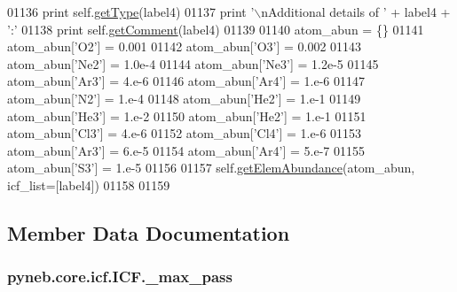 \begin{DoxyCode}
01136         \textcolor{keywordflow}{print} self.\hyperlink{classpyneb_1_1core_1_1icf_1_1_i_c_f_aac6e143db503b68856b979c07f770b81}{getType}(label4)
01137         \textcolor{keywordflow}{print} \textcolor{stringliteral}{'\(\backslash\)nAdditional details of '} + label4 + \textcolor{stringliteral}{':'}
01138         \textcolor{keywordflow}{print} self.\hyperlink{classpyneb_1_1core_1_1icf_1_1_i_c_f_a0a07d882935f470f4c51af82ed785217}{getComment}(label4) 
01139 
01140         atom\_abun = \{\}
01141         atom\_abun[\textcolor{stringliteral}{'O2'}] = 0.001
01142         atom\_abun[\textcolor{stringliteral}{'O3'}] = 0.002
01143         atom\_abun[\textcolor{stringliteral}{'Ne2'}] = 1.0e-4
01144         atom\_abun[\textcolor{stringliteral}{'Ne3'}] = 1.2e-5
01145         atom\_abun[\textcolor{stringliteral}{'Ar3'}] = 4.e-6
01146         atom\_abun[\textcolor{stringliteral}{'Ar4'}] = 1.e-6
01147         atom\_abun[\textcolor{stringliteral}{'N2'}] = 1.e-4
01148         atom\_abun[\textcolor{stringliteral}{'He2'}] = 1.e-1
01149         atom\_abun[\textcolor{stringliteral}{'He3'}] = 1.e-2
01150         atom\_abun[\textcolor{stringliteral}{'He2'}] = 1.e-1
01151         atom\_abun[\textcolor{stringliteral}{'Cl3'}] = 4.e-6
01152         atom\_abun[\textcolor{stringliteral}{'Cl4'}] = 1.e-6
01153         atom\_abun[\textcolor{stringliteral}{'Ar3'}] = 6.e-5
01154         atom\_abun[\textcolor{stringliteral}{'Ar4'}] = 5.e-7
01155         atom\_abun[\textcolor{stringliteral}{'S3'}] = 1.e-5
01156 
01157         self.\hyperlink{classpyneb_1_1core_1_1icf_1_1_i_c_f_a30b52d6d1ec148fba7c0a15cad653f61}{getElemAbundance}(atom\_abun, icf\_list=[label4])
01158 
01159 \end{DoxyCode}


\subsection{Member Data Documentation}
\hypertarget{classpyneb_1_1core_1_1icf_1_1_i_c_f_a994574a4b1fff9d0700fb483dabc8238}{}
\subsubsection[{\+\_\+max\+\_\+pass}]{\setlength{\rightskip}{0pt plus 5cm}pyneb.\+core.\+icf.\+I\+C\+F.\+\_\+max\+\_\+pass\hspace{0.3cm}{\ttfamily [private]}}\label{classpyneb_1_1core_1_1icf_1_1_i_c_f_a994574a4b1fff9d0700fb483dabc8238}


